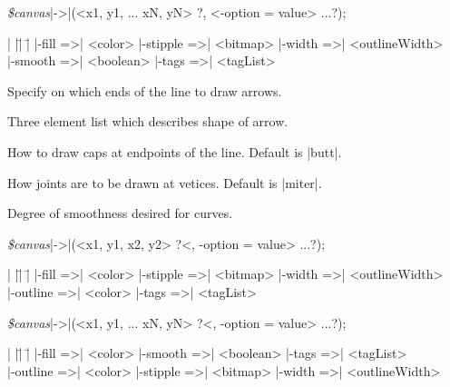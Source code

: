 {\samepage
{\it \$canvas}|->|(<x1, y1, ... xN, yN> ?, <-option =\> value> ...?);
\begin{tabbing}
|                   |\=|                 |\= \kill
|-fill =>| <color>        \> |-stipple =>| <bitmap> \> |-width =>| <outlineWidth> \\
|-smooth =>| <boolean>    \> |-tags =>| <tagList>   \>  \\
\end{tabbing}
}
\vspace{-10pt}

\begin{enum}{1cm}

Specify on which ends of the line to draw arrows.

Three element list which describes shape of arrow.

How to draw caps at endpoints of the line. Default is |butt|.

How joints are to be  drawn at vetices. Default is |miter|.

Degree of smoothness desired for  curves.

\end{enum}
\vskip5pt

{\samepage
{\it \$canvas}|->|(<x1, y1, x2, y2> ?<, -option =\> value> ...?);
\begin{tabbing}
|                |\=|                   |\= \kill
|-fill =>| <color>        \> |-stipple =>| <bitmap> \> |-width =>| <outlineWidth> \\
|-outline =>| <color>     \> |-tags =>| <tagList>   \>  \\
\end{tabbing}
}

{\samepage
{\it \$canvas}|->|(<x1, y1, ... xN, yN> ?<, -option =\> value> ...?);
\begin{tabbing}
|                |\=|                   |\= \kill
|-fill =>| <color>    \> |-smooth =>| <boolean> \> |-tags =>| <tagList> \\
|-outline =>| <color> \> |-stipple =>| <bitmap> \> |-width =>| <outlineWidth> \\
\end{tabbing}
}
\vspace{-10pt}

